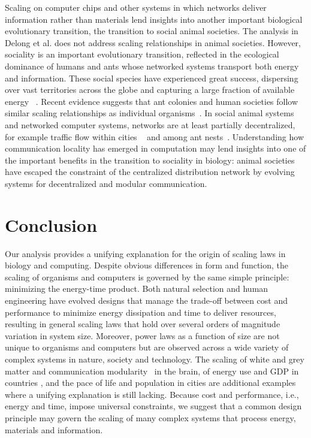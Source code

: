 \documentclass[12pt]{article}
\begin{document}
Scaling on computer chips and other systems in which networks deliver
information rather than materials lend insights into another important
biological evolutionary transition, the transition to social animal societies.
The analysis in Delong et al. does not address scaling relationships in animal societies.
However, sociality is an important evolutionary transition, reflected in the
ecological dominance of humans and ants whose networked
systems transport both energy and information. These social species have experienced great success, dispersing over vast territories across the globe and capturing a large
fraction of available energy ~\cite{haberl2007quantifying, holldobler1990ants}. Recent evidence suggests that ant colonies and
human societies follow similar scaling relationships as individual organisms~\cite{moses2003allometry, bettencourt2007growth, burnside2012human, hou2010energetic, waters2010allometric}. In social animal systems and networked computer systems, networks
are at least partially decentralized, for example traffic flow within cities ~\cite{samaniego2008cities} and among ant nests~\cite{flanagan2013fast}. Understanding
how communication locality has emerged in computation may lend insights into
one of the important benefits in the transition to sociality in biology: animal
societies have escaped the constraint of the centralized distribution network
by evolving systems for decentralized and modular communication.


\section{Conclusion}

Our analysis provides a unifying explanation for the origin of scaling laws in
biology and computing. Despite obvious differences in form and function, the
scaling of organisms and computers is governed by the same simple principle: minimizing the energy-time product. Both natural selection and human engineering have evolved designs that manage the trade-off between cost and performance to minimize energy dissipation and time to deliver resources, resulting in general scaling laws that hold over several orders of magnitude variation in system size. Moreover, power laws as a function of size are not
unique to organisms and computers but are observed across a wide
variety of complex systems in nature, society and technology.  The scaling of
white and grey matter\cite{zhang00} and communication modularity~\cite{meunier2010modular} in the brain, of energy use and GDP in
countries \cite{brown11}, and the pace of life and population in cities
\cite{bettencourt07} are additional examples where a unifying explanation is
still lacking.  Because cost and performance, i.e., energy and time, impose
universal constraints, we suggest that a common design principle may govern the
scaling of many complex systems that process energy, materials and information.
\end{document}
